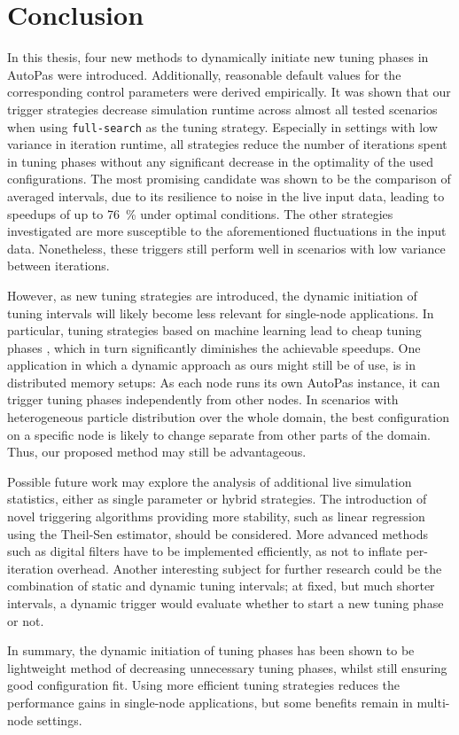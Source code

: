 \chapter[Conclusion]{Conclusion}
\label{cp:conclusion}

\vspace*{-2ex} %
In this thesis, four new methods to dynamically initiate new tuning phases in AutoPas were introduced. Additionally, reasonable default values for the corresponding control parameters were derived empirically.
It was shown that our trigger strategies decrease simulation runtime across almost all tested scenarios when using \texttt{full-search} as the tuning strategy. %
Especially in settings with low variance in iteration runtime, all strategies reduce the number of iterations spent in tuning phases without any significant decrease in the optimality of the used configurations. %
The most promising candidate was shown to be the comparison of averaged intervals, due to its resilience to noise in the live input data, leading to speedups of up to \qty{76}{\percent} under optimal conditions.
The other strategies investigated are more susceptible to the aforementioned fluctuations in the input data. Nonetheless, these triggers still perform well in scenarios with low variance between iterations. %

However, as new tuning strategies are introduced, the dynamic initiation of tuning intervals will likely become less relevant for single-node applications. In particular, tuning strategies based on machine learning lead to cheap tuning phases \cite{Newcome2025}, which in turn significantly diminishes the achievable speedups. One application in which a dynamic approach as ours might still be of use, is in distributed memory setups: As each node runs its own AutoPas instance, it can trigger tuning phases independently from other nodes. In scenarios with heterogeneous particle distribution over the whole domain, the best configuration on a specific node is likely to change separate from other parts of the domain. Thus, our proposed method may still be advantageous.

Possible future work may explore the analysis of additional live simulation statistics, either as single parameter or hybrid strategies. The introduction of novel triggering algorithms providing more stability, such as linear regression using the Theil-Sen estimator, should be considered. More advanced methods such as digital filters have to be implemented efficiently, as not to inflate per-iteration overhead.
Another interesting subject for further research could be the combination of static and dynamic tuning intervals; at fixed, but much shorter intervals, a dynamic trigger would evaluate whether to start a new tuning phase or not.

In summary, the dynamic initiation of tuning phases has been shown to be lightweight method of decreasing unnecessary tuning phases, whilst still ensuring good configuration fit. Using more efficient tuning strategies reduces the performance gains in single-node applications, but some benefits remain in multi-node settings.
